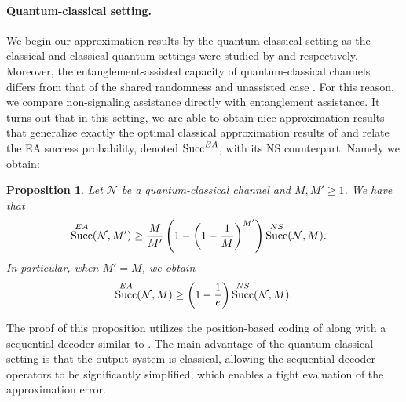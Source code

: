 \documentclass[a4paper,onecolumn,11pt,accepted=2025-10-01]{quantumarticle}
\newtheorem{prop}[theorem]{Proposition}
\DeclareMathOperator{\suc}{Succ}
\newcommand*{\cN}{\mathcal{N}}
\begin{document}
\paragraph{Quantum-classical setting.} We begin our approximation results by the quantum-classical setting as the classical and classical-quantum settings were studied by \cite{barman2017algorithmic}  and \cite{Fawzi19} respectively. Moreover, the entanglement-assisted capacity of quantum-classical channels differs from that of the shared randomness and unassisted case \cite{Bennett1999Oct,Bennett2002Oct,Holevo2012Mar}. For this reason, we compare non-signaling assistance directly with   entanglement assistance. It turns out that in this setting, we are able to obtain nice approximation results that generalize exactly the optimal classical  approximation results of \cite{barman2017algorithmic} and relate the EA success probability, denoted $\suc^{\rm{EA}}$, with its NS counterpart. Namely we obtain:

\begin{prop}\label{prop-intro:rounding-qc}
Let $\cN$ be a quantum-classical channel and  $M, M'\ge 1$. We have that 
  \begin{align}
       \suc^{\rm{EA}}(\cN,M')
       &\ge  \frac{M}{M'}\left(1-\left(1-\frac{1}{M}\right)^{M'}\right) \suc^{\rm{NS}}(\cN,M).
    \end{align}
    In particular, when $M'=M$, we obtain
     \begin{align}
      \suc^{\rm{EA}}(\cN,M)\ge   \left(1-\frac{1}{e}\right) \suc^{\rm{NS}}(\cN,M).
    \end{align}
\end{prop}

The proof of this proposition utilizes the position-based coding of \cite{Anshu2018Jun} along with a sequential decoder similar to \cite{Wilde2013Sep}. The main advantage of the quantum-classical setting is that the output system is classical, allowing the sequential decoder operators to be significantly simplified, which enables a tight evaluation of the approximation error. 
\end{document}
